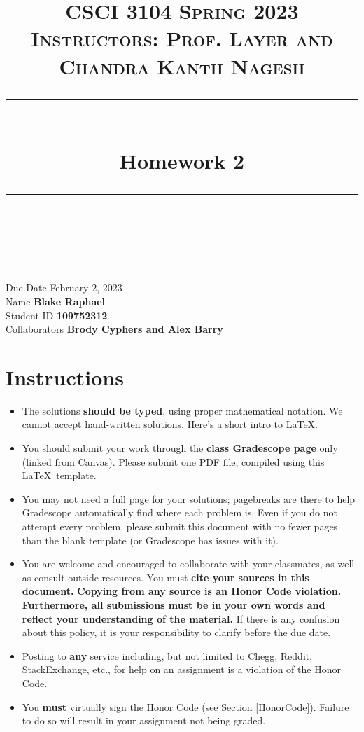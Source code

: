 \documentclass[11pt]{article}
\title{
\normalfont \normalsize 
\textsc{CSCI 3104 Spring 2023 \\ 
Instructors: Prof. Layer and Chandra Kanth Nagesh} \\
[10pt] 
\rule{\linewidth}{0.5pt} \\[6pt] 
\huge Homework 2 \\
\rule{\linewidth}{2pt}  \\[10pt]
}
\date{}
\theoremstyle{definition}
\theoremstyle{definition}
\theoremstyle{definition}
\begin{document}
\maketitle


\noindent
Due Date \dotfill February 2, 2023 \\
Name \dotfill \textbf{Blake Raphael} \\
Student ID \dotfill \textbf{109752312} \\
Collaborators \dotfill \textbf{Brody Cyphers and Alex Barry}

\tableofcontents

\section{Instructions}
 \begin{itemize}
	\item The solutions \textbf{should be typed}, using proper mathematical notation. We cannot accept hand-written solutions. \href{http://ece.uprm.edu/~caceros/latex/introduction.pdf}{Here's a short intro to \LaTeX.}
	\item You should submit your work through the \textbf{class Gradescope page} only (linked from Canvas). Please submit one PDF file, compiled using this \LaTeX \ template.
	\item You may not need a full page for your solutions; pagebreaks are there to help Gradescope automatically find where each problem is. Even if you do not attempt every problem, please submit this document with no fewer pages than the blank template (or Gradescope has issues with it).

	\item You are welcome and encouraged to collaborate with your classmates, as well as consult outside resources. You must \textbf{cite your sources in this document.} \textbf{Copying from any source is an Honor Code violation. Furthermore, all submissions must be in your own words and reflect your understanding of the material.} If there is any confusion about this policy, it is your responsibility to clarify before the due date. 

	\item Posting to \textbf{any} service including, but not limited to Chegg, Reddit, StackExchange, etc., for help on an assignment is a violation of the Honor Code.

	\item You \textbf{must} virtually sign the Honor Code (see Section \ref{HonorCode}). Failure to do so will result in your assignment not being graded.
\end{itemize}
\end{document}
